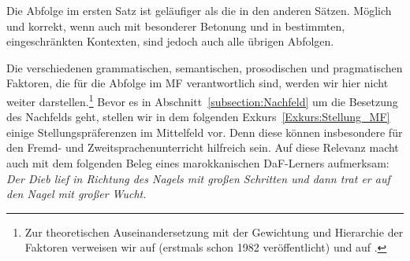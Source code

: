 Die Abfolge im ersten Satz ist geläufiger als die in den anderen Sätzen. Möglich und korrekt, wenn auch mit besonderer Betonung und in bestimmten, eingeschränkten Kontexten, sind jedoch auch alle übrigen Abfolgen. 

Die verschiedenen grammatischen, semantischen, prosodischen und pragmatischen Faktoren, die für die Abfolge im MF verantwortlich sind, werden wir hier nicht weiter darstellen.\footnote{Zur theoretischen Auseinandersetzung mit der Gewichtung und Hierarchie der Faktoren verweisen wir auf \citet{Hoehle19822018} (erstmals schon 1982 veröffentlicht) und auf \citet{Reis1987}.} Bevor es in Abschnitt~\ref{subsection:Nachfeld} um die Besetzung des Nachfelds geht, stellen wir in dem folgenden Exkurs~\ref{Exkurs:Stellung_MF} einige Stellungspräferenzen im Mittelfeld vor. Denn diese können insbesondere für den Fremd- und Zweitsprachenunterricht hilfreich sein. Auf diese Relevanz macht auch \citet[143]{Tahiri2022} mit dem folgenden Beleg eines marokkanischen DaF-Lerners aufmerksam: \textit{Der Dieb lief in Richtung des Nagels mit großen Schritten und dann trat er auf den Nagel mit großer Wucht.} 


